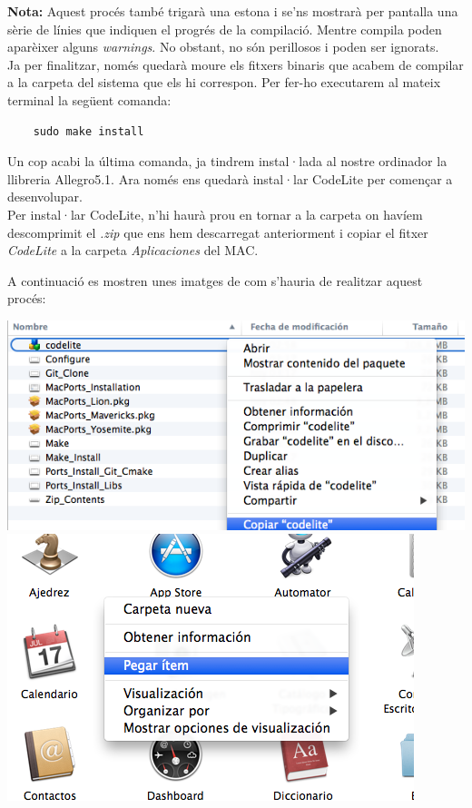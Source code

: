 \documentclass[11pt]{article}
\begin{document}
\noindent \textbf{Nota:} Aquest procés també trigarà una estona i se'ns mostrarà per pantalla una sèrie de línies que indiquen el progrés de la compilació. Mentre compila poden aparèixer alguns \textit{warnings}. No obstant, no són perillosos i poden ser ignorats.\\

\noindent Ja per finalitzar, només quedarà moure els fitxers binaris que acabem de compilar a la carpeta del sistema que els hi correspon. Per fer-ho executarem al mateix terminal la següent comanda:

\begin{verbatim}
	sudo make install
\end{verbatim}

\noindent Un cop acabi la última comanda, ja tindrem instal·lada al nostre ordinador la llibreria Allegro5.1. Ara només ens quedarà instal·lar CodeLite per començar a desenvolupar.\\
 
\noindent Per instal·lar CodeLite, n'hi haurà prou en tornar a la carpeta on havíem descomprimit el \textit{.zip} que ens hem descarregat anteriorment i copiar el fitxer \textit{CodeLite} a la carpeta \textit{Aplicaciones} del MAC.

\newpage

\noindent A continuació es mostren unes imatges de com s'hauria de realitzar aquest procés:

\begin{center}
	\includegraphics[scale=0.5]{img/Copiar_Code_Lite.png}\\\vspace{40px}
	\includegraphics[scale=0.5]{img/Pegar_Aplicaciones.png}\\
\end{center}
\end{document}
